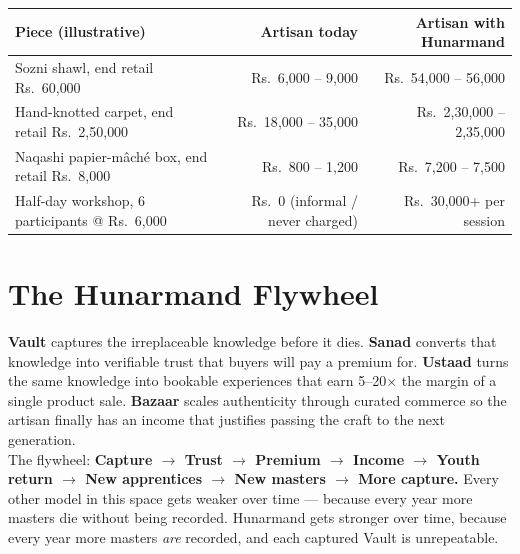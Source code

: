 \documentclass[11pt, a4paper]{article}
\begin{document}
\begin{layerbox}
\begin{center}
\small
\begin{tabularx}{\linewidth}{Xrr}
\toprule
\textbf{Piece (illustrative)} & \textbf{Artisan today} & \textbf{Artisan with Hunarmand} \\
\midrule
Sozni shawl, end retail Rs.\ 60{,}000 & Rs.\ 6{,}000 -- 9{,}000 & Rs.\ 54{,}000 -- 56{,}000 \\
Hand-knotted carpet, end retail Rs.\ 2{,}50{,}000 & Rs.\ 18{,}000 -- 35{,}000 & Rs.\ 2{,}30{,}000 -- 2{,}35{,}000 \\
Naqashi papier-m\^{a}ch\'{e} box, end retail Rs.\ 8{,}000 & Rs.\ 800 -- 1{,}200 & Rs.\ 7{,}200 -- 7{,}500 \\
Half-day workshop, 6 participants @ Rs.\ 6{,}000 & Rs.\ 0 (informal / never charged) & Rs.\ 30{,}000+ per session \\
\bottomrule
\end{tabularx}
\end{center}
\end{layerbox}

\section{The Hunarmand Flywheel}

\begin{insightbox}
\textbf{Vault} captures the irreplaceable knowledge before it dies. \textbf{Sanad} converts that knowledge into verifiable trust that buyers will pay a premium for. \textbf{Ustaad} turns the same knowledge into bookable experiences that earn 5--20$\times$ the margin of a single product sale. \textbf{Bazaar} scales authenticity through curated commerce so the artisan finally has an income that justifies passing the craft to the next generation.\\[5pt]
The flywheel: \textbf{Capture $\to$ Trust $\to$ Premium $\to$ Income $\to$ Youth return $\to$ New apprentices $\to$ New masters $\to$ More capture.} Every other model in this space gets weaker over time --- because every year more masters die without being recorded. Hunarmand gets stronger over time, because every year more masters \textit{are} recorded, and each captured Vault is unrepeatable.
\end{insightbox}
\end{document}
